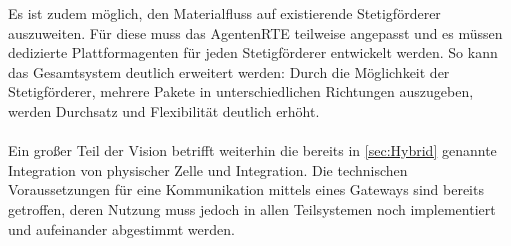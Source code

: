 Es ist zudem möglich, den Materialfluss auf existierende Stetigförderer auszuweiten. Für diese muss das AgentenRTE teilweise angepasst und es müssen dedizierte Plattformagenten für jeden Stetigförderer entwickelt werden. So kann das Gesamtsystem deutlich erweitert werden: Durch die Möglichkeit der Stetigförderer, mehrere Pakete in unterschiedlichen Richtungen auszugeben, werden Durchsatz und Flexibilität deutlich erhöht.
\\\\
Ein großer Teil der Vision betrifft weiterhin die bereits in \autoref{sec:Hybrid} genannte Integration von physischer Zelle und Integration. Die technischen Voraussetzungen für eine Kommunikation mittels eines Gateways sind bereits getroffen, deren Nutzung muss jedoch in allen Teilsystemen noch implementiert und aufeinander abgestimmt werden.




